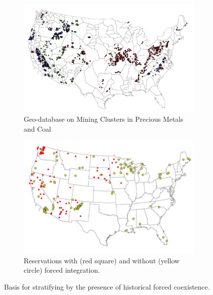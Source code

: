 \documentclass[12pt]{article}
\begin{document}
\begin{figure}[ht!]
\centering
\begin{subfigure}{.5\textwidth}
    \centering
    \includegraphics[scale=0.25]{mining.png}
    \caption{Geo-database on Mining Clusters in Precious Metals and Coal}
    \label{fig:strat:mining}
\end{subfigure}%
\begin{subfigure}{.5\textwidth}
    \centering
    \includegraphics[scale=0.3]{forcedintegration.png}
    \caption{Reservations with (red square) and without (yellow circle) forced integration.}
    \label{fig:strat:reservations}
\end{subfigure}
\caption{Basis for stratifying by the presence of historical forced coexistence.}
\label{fig:strat}
\end{figure}
\end{document}
